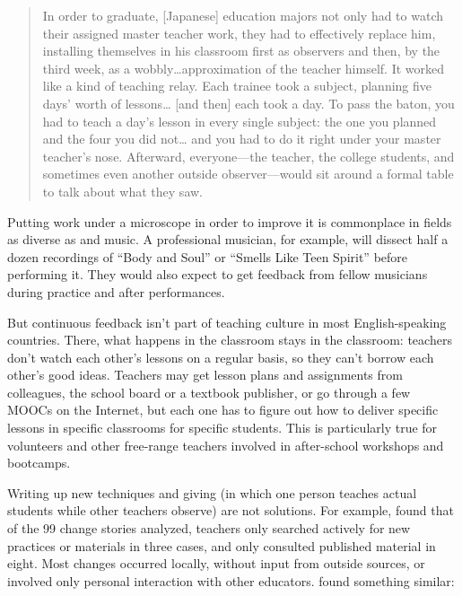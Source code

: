\begin{quote}

  In order to graduate,
  [Japanese] education majors not only had to watch their assigned master teacher work,
  they had to effectively replace him,
  installing themselves in his classroom first as observers and then,
  by the third week,
  as a wobbly{\ldots}approximation of the teacher himself.
  It worked like a kind of teaching relay.
  Each trainee took a subject,
  planning five days' worth of lessons{\ldots} [and then] each took a day.
  To pass the baton,
  you had to teach a day's lesson in every single subject:
  the one you planned and the four you did not{\ldots}
  and you had to do it right under your master teacher's nose.
  Afterward, everyone---the teacher, the college students,
  and sometimes even another outside observer---would sit around a formal table
  to talk about what they saw.

\end{quote}

Putting work under a microscope in order to improve it is commonplace
in fields as diverse as  and music.
A professional musician,
for example,
will dissect half a dozen recordings of ``Body and Soul'' or ``Smells Like Teen Spirit'' before performing it.
They would also expect to get feedback from fellow musicians during practice and after performances.

But continuous feedback isn't part of teaching culture in most English-speaking countries.
There,
what happens in the classroom stays in the classroom:
teachers don't watch each other's lessons on a regular basis,
so they can't borrow each other's good ideas.
Teachers may get lesson plans and assignments from colleagues,
the school board or a textbook publisher,
or go through a few MOOCs on the Internet,
but each one has to figure out
how to deliver specific lessons in specific classrooms for specific students.
This is particularly true for volunteers and other free-range teachers
involved in after-school workshops and bootcamps.

Writing up new techniques
and giving 
(in which one person teaches actual students while other teachers observe)
are not solutions.
For example,
\cite{Finc2007,Finc2012} found that of the 99 change stories analyzed,
teachers only searched actively for new practices or materials in three cases,
and only consulted published material in eight.
Most changes occurred locally,
without input from outside sources,
or involved only personal interaction with other educators.
\cite{Bark2015} found something similar:

